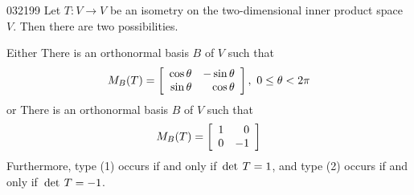 \begin{theorem}{}{032199}
Let $T : V \to V$ be an isometry on the two-dimensional inner product space $V$. Then there are two possibilities.

Either  There is an orthonormal basis $B$ of $V$ such that
\begin{equation*}
M_B(T) = 
\left[ \begin{array}{rr}
\cos \theta & - \sin \theta \\
\sin \theta & \cos \theta
\end{array} \right], \ 0 \leq \theta < 2\pi
\end{equation*}
or \quad {} There is an orthonormal basis $B$ of $V$ such that
\begin{equation*}
M_B(T) = 
\left[ \begin{array}{rr}
1 & 0 \\
0 & -1
\end{array} \right]
\end{equation*}
Furthermore, type {\normalfont (1)} occurs if and only if $\thinspace\operatorname{det\medspace} T = 1$, and type {\normalfont (2)} occurs if and only if $\thinspace\operatorname{det\medspace} T = -1$.
\end{theorem}

